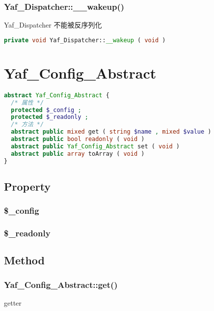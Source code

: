 \subsection{Yaf\_Dispatcher::\_\_wakeup()}

Yaf\_Dispatcher 不能被反序列化

\begin{lstlisting}[language=PHP]
private void Yaf_Dispatcher::__wakeup ( void )
\end{lstlisting}



\chapter{Yaf\_Config\_Abstract}

\begin{lstlisting}[language=PHP]
abstract Yaf_Config_Abstract {
  /* 属性 */
  protected $_config ;
  protected $_readonly ;
  /* 方法 */
  abstract public mixed get ( string $name , mixed $value )
  abstract public bool readonly ( void )
  abstract public Yaf_Config_Abstract set ( void )
  abstract public array toArray ( void )
}
\end{lstlisting}

\section{Property}


\subsection{\$\_config}


\subsection{\$\_readonly}



\section{Method}


\subsection{Yaf\_Config\_Abstract::get()}


getter







